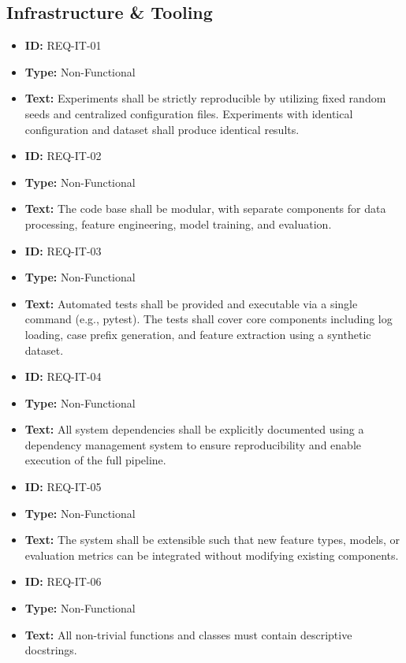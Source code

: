\documentclass[runningheads]{llncs}
\begin{document}
\subsection{Infrastructure \& Tooling}
\begin{itemize}
    \item \textbf{ID:} REQ-IT-01
    \item \textbf{Type:} Non-Functional
    \item \textbf{Text:} Experiments shall be strictly reproducible by utilizing fixed random seeds and centralized configuration files. Experiments with identical configuration and dataset shall produce identical results.

          \vspace{1em}
    \item \textbf{ID:} REQ-IT-02
    \item \textbf{Type:} Non-Functional
    \item \textbf{Text:} The code base shall be modular, with separate components for data processing, feature engineering, model training, and evaluation.

          \vspace{1em}
    \item \textbf{ID:} REQ-IT-03
    \item \textbf{Type:} Non-Functional
    \item \textbf{Text:} Automated tests shall be provided and executable via a single command (e.g., pytest). The tests shall cover core components including log loading, case prefix generation, and feature extraction using a synthetic dataset.

          \vspace{1em}
    \item \textbf{ID:} REQ-IT-04
    \item \textbf{Type:} Non-Functional
    \item \textbf{Text:} All system dependencies shall be explicitly documented using a dependency management system to ensure reproducibility and enable execution of the full pipeline.

          \vspace{1em}
    \item \textbf{ID:} REQ-IT-05
    \item \textbf{Type:} Non-Functional
    \item \textbf{Text:} The system shall be extensible such that new feature types, models, or evaluation metrics can be integrated without modifying existing components.

          \vspace{1em}
    \item \textbf{ID:} REQ-IT-06
    \item \textbf{Type:} Non-Functional
    \item \textbf{Text:} All non-trivial functions and classes must contain descriptive docstrings.

\end{itemize}
\end{document}
